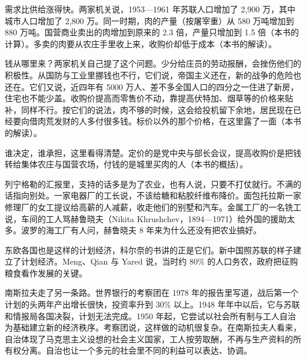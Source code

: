 需求比供给涨得快。两家机关说，1953—1961 年苏联人口增加了 2,900 万，其中城市人口增加了 2,800 万\cite{zv1962}。同一时期，肉的产量（按屠宰重）从 580 万吨增加到 880 万吨\cite{zv1962}。国营商业卖出的肉增加到原来的 2.3 倍，产量只增加到 1.5 倍（本书的计算）。多卖的肉要从农庄手里收上来，收购价却低于成本（本书的解读）。

钱从哪里来？两家机关自己提了这个问题\cite{zv1962}。少分给庄员的劳动报酬，会挫伤他们的积极性\cite{zv1962}。从国防与工业里挪钱也不行，它们说，帝国主义还在，新的战争的危险也还在\cite{zv1962}。它们又说，近四年有 5000 万人、差不多全国人口的四分之一住进了新房，住宅也不能少盖\cite{zv1962}。收购价提高而零售价不动，靠提高伏特加、烟草等的价格来贴补，同样不行\cite{zv1962}。按它们的说法，肉不够的时候，这会给投机留下余地，居民现在已经要向借肉荒发财的人多付很多钱\cite{zv1962}。标价以外的那个价格，在这里露了一面（本书的解读）。

谁决定，谁承担，这里看得清楚。定价的是党中央与部长会议，提高收购价是把钱转给集体农庄与国营农场，付钱的是城里买肉的人（本书的概括）。

列宁格勒的汇报里，支持的话多是为了农业，也有人说，只要不打仗就行\cite{lenkom1962}。不满的话指向别处。一家电器厂的工长说，不该给糖和粘胶纤维布降价\cite{lenkom1962}。面包托拉斯一家修理厂的女工提议给高薪的人减薪，收走他们的别墅和汽车\cite{lenkom1962}。金属工厂的一名铣工说，车间的工人骂赫鲁晓夫（Nikita Khrushchev，1894—1971）给外国的援助太多\cite{lenkom1962,loc43}。波罗的海工厂有人问，赫鲁晓夫 8 年来为什么还没有把农业搞好\cite{lenkom1962}。

东欧各国也是这样的计划经济，科尔奈的书讲的正是它们\cite{kornai1980}。新中国照苏联的样子建立了计划经济。Meng、Qian 与 Yared 说，当时约 80\% 的人口务农，政府把征购粮食看作发展的关键\cite{mqy2010}。

南斯拉夫走了另一条路。世界银行的考察团在 1978 年的报告里写道，战后第一个计划的头两年产出增长很快，投资率升到 30\% 以上\cite{worldbank1978yu}。1948 年年中以后，它与苏联和情报局各国决裂，计划无法完成\cite{worldbank1978yu}。1950 年起，它尝试以社会所有制与工人自治为基础建立新的经济秩序\cite{worldbank1978yu}。考察团说，这样做的动机很复杂。在南斯拉夫人看来，自治体现了马克思主义设想的社会主义国家，工人按劳取酬，不再与生产资料的所有权分离\cite{worldbank1978yu}。自治也让一个多元的社会里不同的利益可以表达、协调\cite{worldbank1978yu}。

